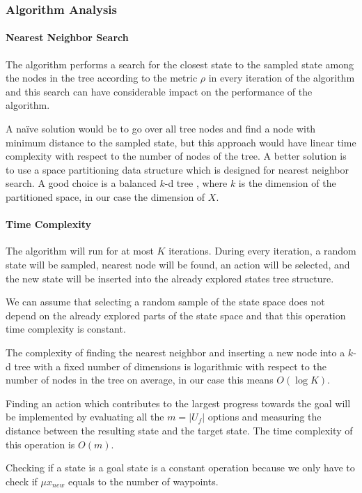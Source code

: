 \subsubsection{Algorithm Analysis}

\paragraph{Nearest Neighbor Search}

The algorithm performs a search for the closest state to the sampled state among the nodes in the tree according to the metric $\rho$ in every iteration of the algorithm and this search can have considerable impact on the performance of the algorithm.

A naïve solution would be to go over all tree nodes and find a node with minimum distance to the sampled state, but this approach would have linear time complexity with respect to the number of nodes of the tree. A better solution is to use a space partitioning data structure which is designed for nearest neighbor search. A good choice is a balanced $k$-d tree \cite{kd-tree}, where $k$ is the dimension of the partitioned space, in our case the dimension of $X$.

\paragraph{Time Complexity}

The algorithm will run for at most $K$ iterations. During every iteration, a random state will be sampled, nearest node will be found, an action will be selected, and the new state will be inserted into the already explored states tree structure.

We can assume that selecting a random sample of the state space does not depend on the already explored parts of the state space and that this operation time complexity is constant.

The complexity of finding the nearest neighbor and inserting a new node into a $k$-d tree with a fixed number of dimensions is logarithmic with respect to the number of nodes in the tree on average, in our case this means $O(\log K)$.

Finding an action which contributes to the largest progress towards the goal will be implemented by evaluating all the $m=|U_f|$ options and measuring the distance between the resulting state and the target state. The time complexity of this operation is $O(m)$.

Checking if a state is a goal state is a constant operation because we only have to check if $\mu{x_{new}}$ equals to the number of waypoints.

